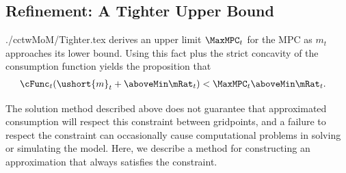 \documentclass[titlepage]{\econtex}
\begin{document}
\subsection{Refinement: A Tighter Upper Bound}
\begin{verbatimwrite}{./cctwMoM/Tighter.tex}
\cite{BufferStockTheory} derives an upper limit  $\MaxMPC_{t}$ for the MPC as $m_{t}$
approaches its lower bound.  Using this 
fact plus the strict concavity of the consumption function yields the
proposition that 
\begin{eqnarray}
\cFunc_{t}(\ushort{m}_{t}+\aboveMin \mRat_{t}) & < \MaxMPC_{t} \aboveMin \mRat_{t}.
\end{eqnarray}

The solution method described above does not guarantee that
approximated consumption will respect this constraint between gridpoints, and a failure to 
respect the constraint can occasionally cause computational problems in solving
or simulating the model.  Here, we 
describe a method for constructing an approximation that always
satisfies the constraint.

\end{verbatimwrite}
\end{document}
